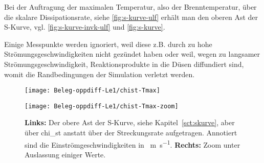 Bei der Auftragung der maximalen Temperatur, also der Brenntemperatur, über die skalare Dissipationsrate, siehe \autoref{fig:s-kurve-ulf} erhält man den oberen Ast der S-Kurve, vgl. \autoref{fig:s-kurve-invk-ulf} und \ref{fig:s-kurve}.

Einige Messpunkte werden ignoriert, weil diese z.B. durch zu hohe Strömungsgeschwindigkeiten nicht gezündet haben oder weil, wegen zu langsamer Strömungsgeschwindigkeit, Reaktionsprodukte in die Düsen diffundiert sind, womit die Randbedingungen der Simulation verletzt werden.


\begin{figure}[H]
    \begin{center}\begin{minipage}{0.49\linewidth}\begin{center}
        \texttt{[image: Beleg-oppdiff-Le1/chist-Tmax]}
    \end{center}\end{minipage}\begin{minipage}{0.49\linewidth}\begin{center}
        \texttt{[image: Beleg-oppdiff-Le1/chist-Tmax-zoom]}
    \end{center}\end{minipage}\end{center}
    \caption{\textbf{Links:} Der obere Ast der S-Kurve, siehe Kapitel~\ref{sct:skurve}, aber über \gls{chi_st} anstatt über der Streckungsrate aufgetragen. Annotiert sind die Einströmgeschwindigkeiten in \SI{}{\meter\per\second}. \textbf{Rechts:} Zoom unter Auslassung einiger Werte.}
    \label{fig:s-kurve-ulf}
\end{figure}

